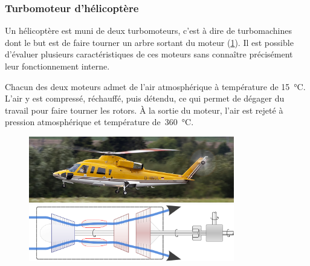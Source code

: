 \subsubsection{Turbomoteur d’hélicoptère}
\label{exo_turbomoteur_puissances_spe}

	Un hélicoptère est muni de deux turbomoteurs, c’est à dire de turbomachines dont le but est de faire tourner un arbre sortant du moteur (\cref{fig_s76b}). Il est possible d’évaluer plusieurs caractéristiques de ces moteurs sans connaître précisément leur fonctionnement interne.
	
	Chacun des deux moteurs admet de l’air atmosphérique à température de \SI{15}{\degreeCelsius}. L’air y est compressé, réchauffé, puis détendu, ce qui permet de dégager du travail pour faire tourner les rotors. À la sortie du moteur, l’air est rejeté à pression atmosphérique et température de~\SI{360}{\degreeCelsius}.

	\begin{figure}
		\begin{center}
			\includegraphics[width=0.8\textwidth]{images/sikorsky_s76b.jpg}
			\vspace{0.5cm}\\
			\includegraphics[width=0.8\textwidth]{images/turbomoteur_principe.png}
		\end{center}
		\label{fig_s76b}
	\end{figure}

